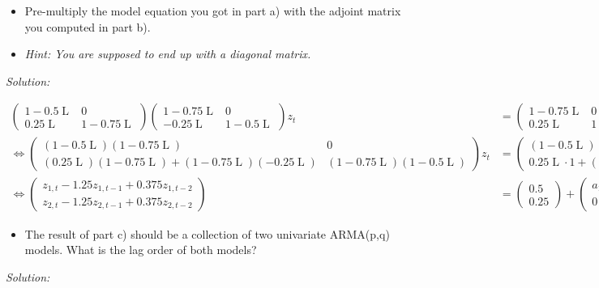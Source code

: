 \documentclass[12pt,a4paper]{article}
\newcommand{\Lag}{\operatorname{L}} %
\begin{document}
\begin{itemize}
    \item[c)]Pre-multiply the model equation you got in part a) with the adjoint matrix you computed in part b).
    \item[]  \textit{Hint: You are supposed to end up with a diagonal matrix.}
\end{itemize}

\emph{Solution:}

\begin{tiny}
\begin{align*}
  \begin{pmatrix} 1- 0.5 \Lag & 0 \\ 0.25 \Lag & 1 - 0.75 \Lag  \end{pmatrix} \begin{pmatrix} 1- 0.75 \Lag & 0 \\ -0.25 \Lag & 1 - 0.5 \Lag  \end{pmatrix} z_t & = \begin{pmatrix} 1 - 0.75 \Lag & 0 \\ 0.25 \Lag & 1 - 0.75 \Lag \end{pmatrix} \cdot \left( \phi_0 + a_t \right) \\
  \Leftrightarrow \begin{pmatrix} (1- 0.5 \Lag) (1- 0.75 \Lag) & 0 \\
  (0.25 \Lag) (1 - 0.75 \Lag) + (1 - 0.75 \Lag) (-0.25 \Lag) & (1 - 0.75 \Lag) (1 - 0.5 \Lag)
  \end{pmatrix} z_t  & = 
  \begin{pmatrix} (1 - 0.5 \Lag) \cdot 1 \\ 0.25 \Lag \cdot 1 +(1- 0.75 \Lag) \cdot 0 \end{pmatrix} +  
  \begin{pmatrix} (1 - 0.5 \Lag) \cdot a_{1,t} \\ (0.25 \Lag ) a_{1,t} + 1 (1- 0.75 \Lag) a_{2,t}\end{pmatrix} \\
  \Leftrightarrow \begin{pmatrix} z_{1,t} - 1.25 z_{1, t-1} + 0.375 z_{1, t-2} \\ z_{2,t} - 1.25 z_{2, t-1} + 0.375 z_{2, t-2} \end{pmatrix} 
  & = \begin{pmatrix} 0.5 \\ 0.25 \end{pmatrix} + \begin{pmatrix} a_{1,t} - 0.5 a_{1, t-1} \\ 
  0 + 0.25 a_{1, t-1} + a_{2,t} - 0.75 a_{2, t-1}\end{pmatrix}  
\end{align*}
\end{tiny}

\begin{itemize}
    \item[d)] The result of part c) should be a collection of two univariate ARMA(p,q) models. What is the lag order of both models?
\end{itemize}

\emph{Solution:}
\end{document}
